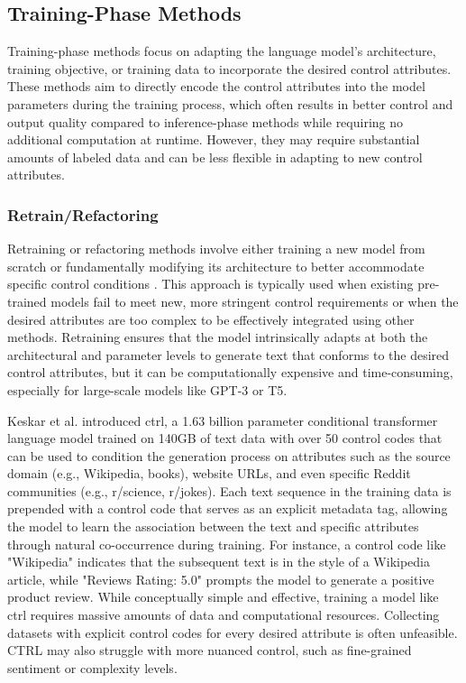 \subsection{Training-Phase Methods}
Training-phase methods focus on adapting the language model's architecture, training objective, or training data to incorporate the desired control attributes. 
These methods aim to directly encode the control attributes into the model parameters during the training process, which often results in better control and output quality compared to inference-phase methods while requiring no additional computation at runtime.
However, they may require substantial amounts of labeled data and can be less flexible in adapting to new control attributes.

\subsubsection{Retrain/Refactoring}
Retraining or refactoring methods involve either training a new model from scratch or fundamentally modifying its architecture to better accommodate specific control conditions \cite{liang2024controllabletextgenerationlarge}. 
This approach is typically used when existing pre-trained models fail to meet new, more stringent control requirements or when the desired attributes are too complex to be effectively integrated using other methods.
Retraining ensures that the model intrinsically adapts at both the architectural and parameter levels to generate text that conforms to the desired control attributes, but it can be computationally expensive and time-consuming, especially for large-scale models like GPT-3 or T5.

Keskar et al. \cite{keskar2019ctrlconditionaltransformerlanguage} introduced \gls{ctrl}, a 1.63 billion parameter conditional transformer language model trained on 140GB of text data with over 50 control codes that can be used to condition the generation process on attributes such as the source domain (e.g., Wikipedia, books), website URLs, and even specific Reddit communities (e.g., r/science, r/jokes).
Each text sequence in the training data is prepended with a control code that serves as an explicit metadata tag, allowing the model to learn the association between the text and specific attributes through natural co-occurrence during training.
For instance, a control code like "Wikipedia" indicates that the subsequent text is in the style of a Wikipedia article, while "Reviews Rating: 5.0" prompts the model to generate a positive product review.
While conceptually simple and effective, training a model like \gls{ctrl} requires massive amounts of data and computational resources. 
Collecting datasets with explicit control codes for every desired attribute is often unfeasible.
CTRL may also struggle with more nuanced control, such as fine-grained sentiment or complexity levels.

